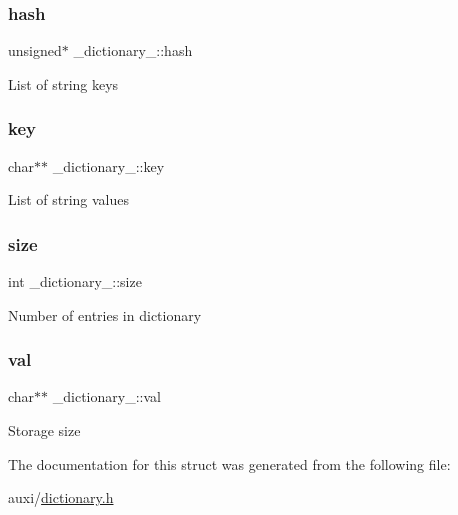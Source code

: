 \subsubsection{\texorpdfstring{hash}{hash}}
{\footnotesize\ttfamily unsigned$\ast$ \+\_\+dictionary\+\_\+\+::hash}

List of string keys \mbox{\label{struct__dictionary___a3c962bd7edff49be125396596d1bec75}} 
\subsubsection{\texorpdfstring{key}{key}}
{\footnotesize\ttfamily char$\ast$$\ast$ \+\_\+dictionary\+\_\+\+::key}

List of string values \mbox{\label{struct__dictionary___a2d90a3894737abd3270d8b9aefaac5ef}} 
\subsubsection{\texorpdfstring{size}{size}}
{\footnotesize\ttfamily int \+\_\+dictionary\+\_\+\+::size}

Number of entries in dictionary \mbox{\label{struct__dictionary___a7a89c8fb24cb365745431d881f8f0afd}} 
\subsubsection{\texorpdfstring{val}{val}}
{\footnotesize\ttfamily char$\ast$$\ast$ \+\_\+dictionary\+\_\+\+::val}

Storage size 

The documentation for this struct was generated from the following file\+:\begin{DoxyCompactItemize}
\item 
auxi/\hyperlink{dictionary_8h}{dictionary.\+h}\end{DoxyCompactItemize}
